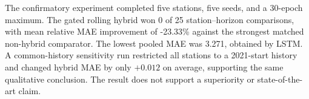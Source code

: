 The confirmatory experiment completed five stations, five seeds, and a 30-epoch maximum. The gated rolling hybrid won 0 of 25 station--horizon comparisons, with mean relative MAE improvement of -23.33\% against the strongest matched non-hybrid comparator. The lowest pooled MAE was 3.271, obtained by LSTM. A common-history sensitivity run restricted all stations to a 2021-start history and changed hybrid MAE by only \(+0.012\) on average, supporting the same qualitative conclusion. The result does not support a superiority or state-of-the-art claim.
